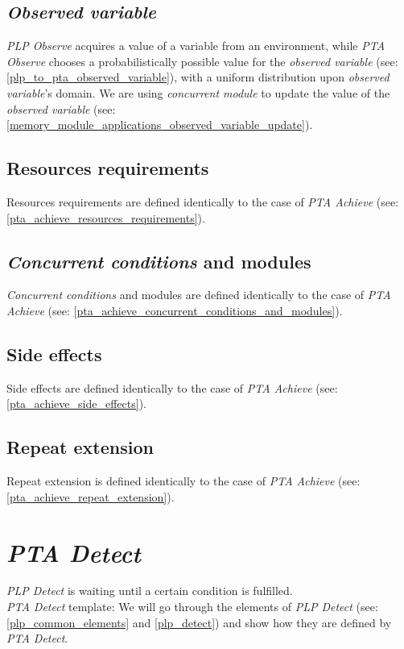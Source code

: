 \subsection{\textit{Observed variable} }
\textit{PLP Observe} acquires a value of a variable from an environment, while \textit{PTA Observe} chooses a probabilistically possible value for the \textit{observed variable} (see: \ref{plp_to_pta_observed_variable}), with a uniform distribution upon \textit{observed variable}’s domain. We are using \textit{concurrent module} to update the value of the \textit{observed variable} (see: \ref{memory_module_applications_observed_variable_update}).\\
\subsection{Resources requirements}
Resources requirements are defined identically to the case of \textit{PTA Achieve}  (see: \ref{pta_achieve_resources_requirements}).\\
\subsection{\textit{Concurrent conditions} and modules}
\textit{Concurrent conditions} and modules are defined identically to the case of \textit{PTA Achieve}  (see: \ref{pta_achieve_concurrent_conditions_and_modules}).\\
\subsection{Side effects}
Side effects are defined identically to the case of \textit{PTA Achieve}  (see: \ref{pta_achieve_side_effects}). \\
\subsection{Repeat extension}
Repeat extension is defined identically to the case of \textit{PTA Achieve} (see: \ref{pta_achieve_repeat_extension}).\\
\clearpage
\section{\textit{PTA Detect}}
\textit{PLP Detect} is waiting until a certain condition is fulfilled. \\
\textit{PTA Detect} template:  We will go through the elements of \textit{PLP Detect} (see: \ref{plp_common_elements} and \ref{plp_detect}) and show how they are defined by \textit{PTA Detect}.\\
